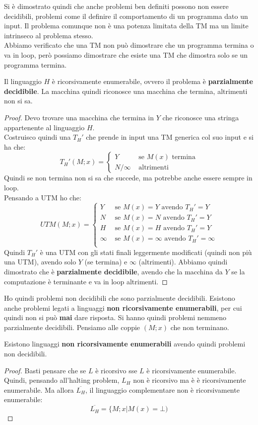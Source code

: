 Si è dimostrato quindi che anche problemi ben definiti possono non essere
decidibili, problemi come il definire il comportamento di un programma dato un
input. Il problema comunque non è una potenza limitata della TM ma un limite
intrinseco al problema stesso. \\ Abbiamo verificato che una TM non può dimostrare che un programma termina o va in loop, però possiamo dimostrare che esiste una TM che dimostra solo se un programma termina.
\begin{definizione}
  Il linguaggio $H$ è ricorsivamente enumerabile, ovvero il problema è
  \textbf{parzialmente decidibile}. La macchina quindi riconosce una macchina
  che termina, altrimenti non si sa.  
\end{definizione}
\begin{proof}
  Devo trovare una macchina che termina in $Y$ che riconosce una stringa
  appartenente al linguaggio $H$.\\
  Costruisco quindi una $T_H'$ che prende in input una TM generica col suo
  input e si ha che:
  \[T_H'(M;x)=
   \begin{cases}
     Y &\mbox{ se } M(x)\mbox{ termina}\\
     N/\infty &\mbox{ altrimenti}
    \end{cases}
  \]
  Quindi se non termina non si sa che succede, ma potrebbe anche essere sempre
  in loop.\\
  Pensando a UTM ho che:
  \[UTM(M;x)=
   \begin{cases}
     Y &\mbox{ se } M(x)=Y\mbox{ avendo }T_H'=Y\\
     N &\mbox{ se } M(x)=N\mbox{ avendo }T_H'=Y\\
     H &\mbox{ se } M(x)=H\mbox{ avendo }T_H'=Y\\
     \infty &\mbox{ se } M(x)=\infty\mbox{ avendo }T_H'=\infty\\
    \end{cases}
  \]
  Quindi $T_H'$ è una UTM con gli stati finali leggermente modificati (quindi
  non più una UTM), avendo
  solo $Y$ (se termina) e $\infty$ (altrimenti). Abbiamo quindi dimostrato che è
  \textbf{parzialmente decidibile}, avendo che la macchina da $Y$ se la
  computazione è terminante e va in loop altrimenti.
\end{proof}
Ho quindi problemi non decidibili che sono parzialmente decidibili. Esistono
anche problemi legati a linguaggi \textbf{non ricorsivamente enumerabili}, per
cui quindi non si può \textbf{mai} dare risposta. Si hanno quindi problemi
nemmeno parzialmente decidibili. Pensiamo alle coppie $(M;x)$ che non terminano.
\begin{definizione}
   Esistono linguaggi \textbf{non ricorsivamente enumerabili} avendo quindi
   problemi non decidibili.
\end{definizione}
\begin{proof}
  Basti pensare che se $L$ è ricorsivo sse $L$ è ricorsivamente
  enumerabile. Quindi, pensando all'halting problem, $L_H$ non è ricorsivo ma è
  è ricorsivamente enumerabile. Ma allora $\overline{L_H}$, il linguaggio
  complementare non è ricorsivamente enumerabile: 
  \[\overline{L_H}=\{M;x|M(x)=\bot)\]
\end{proof}
